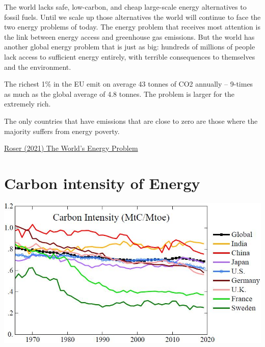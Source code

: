 \documentclass[
]{book}
\begin{document}
The world lacks safe, low-carbon, and cheap large-scale energy alternatives to fossil fuels. Until we scale up those alternatives the world will continue to face the two energy problems of today. The energy problem that receives most attention is the link between energy access and greenhouse gas emissions. But the world has another global energy problem that is just as big: hundreds of millions of people lack access to sufficient energy entirely, with terrible consequences to themselves and the environment.

The richest 1\% in the EU emit on average 43 tonnes of CO2 annually -- 9-times as much as the global average of 4.8 tonnes.
The problem is larger for the extremely rich.

The only countries that have emissions that are close to zero are those where the majority suffers from energy poverty.

\href{https://ourworldindata.org/worlds-energy-problem}{Roser (2021) The World's Energy Problem}

\hypertarget{carbon-intensity-of-energy}{%
\chapter{Carbon intensity of Energy}\label{carbon-intensity-of-energy}}

\includegraphics{fig/carbon_intensity_James_Hansen_planetCh47.jpg}
\end{document}
